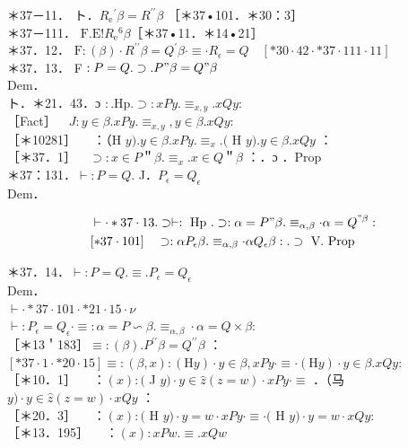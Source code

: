 \documentclass[10pt]{article}
\begin{document}
＊37－11． ト．$R_{\mathrm{e}}{ }^{\prime} \beta=R^{\prime \prime} \beta$ ［＊37•101．＊30：3］\\
＊37－111． $\mathrm{F} . \mathrm{E}!R_{\mathrm{e}}{ }^{6} \beta$［＊37•11．＊14•21］\\
＊37．12． $\mathrm{F}:(\beta) \cdot R^{\prime \prime} \beta=Q^{\prime} \beta \cdot \equiv \cdot R_{\epsilon}=Q \quad[* 30 \cdot 42 \cdot * 37 \cdot 111 \cdot 11]$\\
＊37．13． F $: P=Q . \supset . P " \beta=Q " \beta$\\
Dem．\\
ト．＊21．43．ɔ $: . \mathrm{Hp} . \supset: x P y . \equiv_{x, y} . x Q y:$\\
［Fact］$\quad J: y \in \beta . x P y . \equiv_{x, y}, y \in \beta . x Q y:$\\
［＊10281］$\quad$ ：（H $y) . y \in \beta . x P y . \equiv_{x} .($ H $y) . y \in \beta . x Q y$ ：\\
［＊37．1］$\quad \supset: x \in P$＂$\beta . \equiv_{x} . x \in Q$＂$\beta$ ：．ɔ ．Prop\\
＊37：131．$\vdash: P=Q$. J．$P_{\epsilon}=Q_{\epsilon}$\\
Dem．

$$
\begin{aligned}
& \vdash \cdot * 37 \cdot 13 . \supset \vdash: \text { Hp } . \supset: \alpha=P " \beta . \equiv_{\alpha, \beta} \cdot \alpha=Q^{" \beta}: \\
& {[* 37 \cdot 101] \quad \supset: \alpha P_{\epsilon} \beta . \equiv_{\alpha, \beta} \cdot \alpha Q_{\epsilon} \beta: . \supset \text { V. Prop }}
\end{aligned}
$$

＊37．14．$\vdash: P=Q . \equiv . P_{\epsilon}=Q_{\epsilon}$\\
Dem．\\
$\vdash \cdot * 37 \cdot 101 \cdot * 21 \cdot 15 \cdot \nu$\\
$\vdash: P_{\epsilon}=Q_{\epsilon} \cdot \equiv: \alpha=P \backsim \beta . \equiv_{\alpha, \beta} \cdot \alpha=Q \times \beta:$\\
［＊13＇183］$\equiv:(\beta) . P^{\prime \prime} \beta=Q^{\prime \prime} \beta$ ：\\
$[* 37 \cdot 1 \cdot * 20 \cdot 15] \equiv:(\beta, x):(\mathrm{H} y) \cdot y \in \beta, x P y \cdot \equiv \cdot(\mathrm{H} y) \cdot y \in \beta . x Q y:$\\
［＊10．1］$\quad$ ：$(x):($ J $y) \cdot y \in \hat{z}(z=w) \cdot x P y \cdot \equiv$ ．（马 $y) \cdot y \in \hat{z}(z=w) \cdot x Q y$ ：\\
［＊20．3］$\quad$ ：$(x):($ H $y) \cdot y=w \cdot x P y \cdot \equiv \cdot($ H $y) \cdot y=w \cdot x Q y:$\\
［＊13．195］$\quad$ ：$(x): x P w . \equiv . x Q w$
\end{document}
